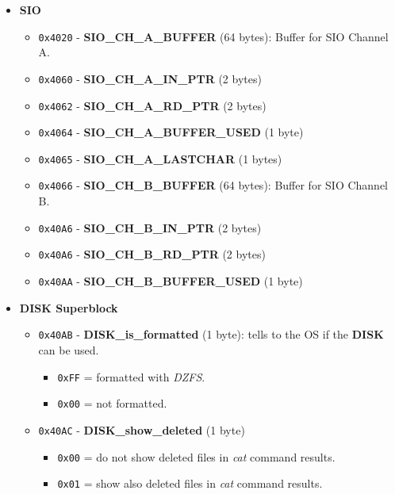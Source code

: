         \begin{itemize}
            \item \textbf{SIO}
            \begin{itemize}
                \item \texttt{0x4020} - \textbf{SIO\_CH\_A\_BUFFER} (64 bytes):
                Buffer for SIO Channel A.
                \item \texttt{0x4060} - \textbf{SIO\_CH\_A\_IN\_PTR} (2 bytes)
                \item \texttt{0x4062} - \textbf{SIO\_CH\_A\_RD\_PTR} (2 bytes)
                \item \texttt{0x4064} - \textbf{SIO\_CH\_A\_BUFFER\_USED} (1 byte)
                \item \texttt{0x4065} - \textbf{SIO\_CH\_A\_LASTCHAR} (1 bytes)
                \item \texttt{0x4066} - \textbf{SIO\_CH\_B\_BUFFER} (64 bytes):
                Buffer for SIO Channel B.
                \item \texttt{0x40A6} - \textbf{SIO\_CH\_B\_IN\_PTR} (2 bytes)
                \item \texttt{0x40A6} - \textbf{SIO\_CH\_B\_RD\_PTR} (2 bytes)
                \item \texttt{0x40AA} - \textbf{SIO\_CH\_B\_BUFFER\_USED} (1 byte)
            \end{itemize}
            \item \textbf{DISK Superblock}
            \begin{itemize}
                \item \texttt{0x40AB} - \textbf{DISK\_is\_formatted} (1 byte): tells
                to the OS if the \textbf{DISK} can be used.
                \begin{itemize}
                    \item \texttt{0xFF} = formatted with \textit{DZFS}.
                    \item \texttt{0x00} = not formatted.
                \end{itemize}
                \item \texttt{0x40AC} - \textbf{DISK\_show\_deleted} (1 byte)
                \begin{itemize}
                    \item \texttt{0x00} = do not show deleted files in \textit{cat}
                    command results.
                    \item \texttt{0x01} = show also deleted files in \textit{cat}
                    command results.

\end{itemize}
\end{itemize}
\end{itemize}
